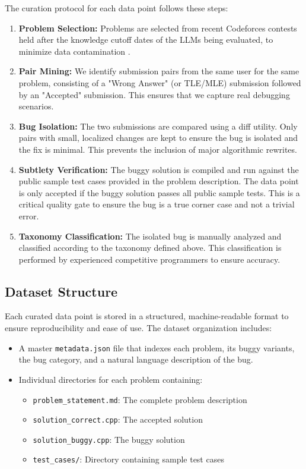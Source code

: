 The curation protocol for each data point follows these steps:

\begin{enumerate}
    \item \textbf{Problem Selection:} Problems are selected from recent Codeforces contests held after the knowledge cutoff dates of the LLMs being evaluated, to minimize data contamination \cite{huang2024competition}.
    
    \item \textbf{Pair Mining:} We identify submission pairs from the same user for the same problem, consisting of a "Wrong Answer" (or TLE/MLE) submission followed by an "Accepted" submission. This ensures that we capture real debugging scenarios.
    
    \item \textbf{Bug Isolation:} The two submissions are compared using a diff utility. Only pairs with small, localized changes are kept to ensure the bug is isolated and the fix is minimal. This prevents the inclusion of major algorithmic rewrites.
    
    \item \textbf{Subtlety Verification:} The buggy solution is compiled and run against the public sample test cases provided in the problem description. The data point is only accepted if the buggy solution passes all public sample tests. This is a critical quality gate to ensure the bug is a true corner case and not a trivial error.
    
    \item \textbf{Taxonomy Classification:} The isolated bug is manually analyzed and classified according to the taxonomy defined above. This classification is performed by experienced competitive programmers to ensure accuracy.
\end{enumerate}

\subsection{Dataset Structure}

Each curated data point is stored in a structured, machine-readable format to ensure reproducibility and ease of use. The dataset organization includes:

\begin{itemize}
    \item A master \texttt{metadata.json} file that indexes each problem, its buggy variants, the bug category, and a natural language description of the bug.
    \item Individual directories for each problem containing:
    \begin{itemize}
        \item \texttt{problem\_statement.md}: The complete problem description
        \item \texttt{solution\_correct.cpp}: The accepted solution
        \item \texttt{solution\_buggy.cpp}: The buggy solution
        \item \texttt{test\_cases/}: Directory containing sample test cases
    \end{itemize}
\end{itemize}

